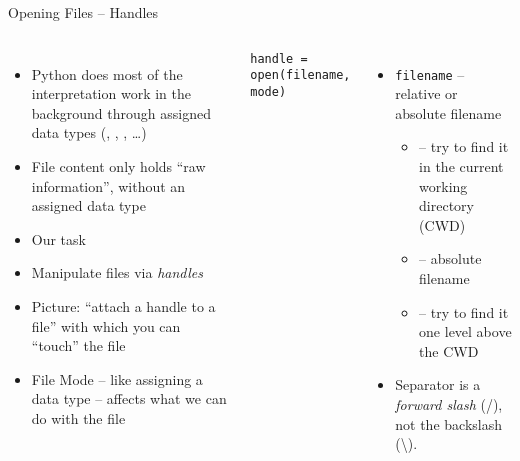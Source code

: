 \begin{frame}[fragile]{Opening Files -- Handles}
%
\vspace{-15pt}
\begin{columns}[t]
\begin{itemize}
\item Python does most of the interpretation work in the background through assigned data types (, , , \ldots)
\item File content only holds \enquote{raw information}, without an assigned data type
\item[\Thus] Our task
\item Manipulate files via \emph{handles}
\item Picture: \enquote{attach a handle to a file} with which you can \enquote{touch} the file
\item File Mode -- like assigning a data type -- affects what we can do with the file
\end{itemize}
%
\begin{codebox}
\begin{verbatim}
handle = open(filename, mode)
\end{verbatim}
\end{codebox}
%
\begin{itemize}
\item \texttt{filename} -- relative or absolute filename
	\vspace{-12pt}
	\begin{itemize}
	\item {} -- try to find it in the current working directory (CWD)
	\item {} -- absolute filename
	\item {} -- try to find it one level above the CWD
	\end{itemize}
\item Separator is a \emph{forward slash} (/), not the backslash (\textbackslash).
\end{itemize}
\end{columns}
%
\end{frame}


